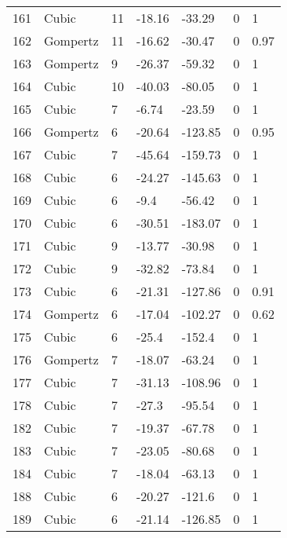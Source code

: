 \documentclass[11pt]{article}
\begin{document}
\begin{center}
\begin{longtable}{lllllll}
    161 & Cubic     & 11              & -18.16  & -33.29  & 0       & 1    \\
    162 & Gompertz  & 11              & -16.62  & -30.47  & 0       & 0.97 \\
    163 & Gompertz  & 9               & -26.37  & -59.32  & 0       & 1    \\
    164 & Cubic     & 10              & -40.03  & -80.05  & 0       & 1    \\
    165 & Cubic     & 7               & -6.74   & -23.59  & 0       & 1    \\
    166 & Gompertz  & 6               & -20.64  & -123.85 & 0       & 0.95 \\
    167 & Cubic     & 7               & -45.64  & -159.73 & 0       & 1    \\
    168 & Cubic     & 6               & -24.27  & -145.63 & 0       & 1    \\
    169 & Cubic     & 6               & -9.4    & -56.42  & 0       & 1    \\
    170 & Cubic     & 6               & -30.51  & -183.07 & 0       & 1    \\
    171 & Cubic     & 9               & -13.77  & -30.98  & 0       & 1    \\
    172 & Cubic     & 9               & -32.82  & -73.84  & 0       & 1    \\
    173 & Cubic     & 6               & -21.31  & -127.86 & 0       & 0.91 \\
    174 & Gompertz  & 6               & -17.04  & -102.27 & 0       & 0.62 \\
    175 & Cubic     & 6               & -25.4   & -152.4  & 0       & 1    \\
    176 & Gompertz  & 7               & -18.07  & -63.24  & 0       & 1    \\
    177 & Cubic     & 7               & -31.13  & -108.96 & 0       & 1    \\
    178 & Cubic     & 7               & -27.3   & -95.54  & 0       & 1    \\
    182 & Cubic     & 7               & -19.37  & -67.78  & 0       & 1    \\
    183 & Cubic     & 7               & -23.05  & -80.68  & 0       & 1    \\
    184 & Cubic     & 7               & -18.04  & -63.13  & 0       & 1    \\
    188 & Cubic     & 6               & -20.27  & -121.6  & 0       & 1    \\
    189 & Cubic     & 6               & -21.14  & -126.85 & 0       & 1    \\

\end{longtable}
\end{center}
\end{document}
